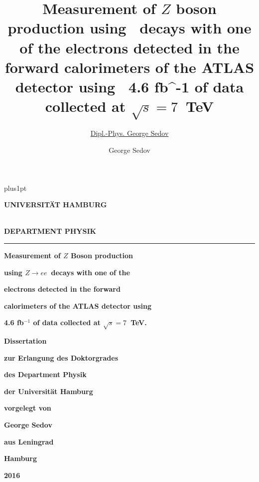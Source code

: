 \documentclass[oneside,11pt]{Classes/PhDthesisPSnPDF}
\title{Measurement of $Z$ boson production using \Zee\ decays with one of the electrons
detected in the forward calorimeters of the ATLAS detector using  4.6 {fb}^{-1} of data
collected at $\sqrt{s} = 7$~TeV}
\author{\href{radist.morse@gmail.com}{Dipl.-Phys. George Sedov}}
\author{George Sedov}
\def\Zee{\ensuremath{Z \rightarrow ee}}
\begin{document}
\hypersetup{linktocpage}
%

\renewcommand\baselinestretch{1.2}
\baselineskip=16pt plus1pt


\begin{titlepage}
\vspace*{-1.6cm}
{\raggedright \large \bf \MakeUppercase{Universit\"{a}t Hamburg}} \\
{\large \bf \MakeUppercase{Department Physik} }\\
  \rule{\textwidth}{0.5pt}
    \vspace*{1.0cm}
	\begin{center}

	     {\huge\bf{Measurement of $Z$ Boson production}\par}
           \vspace*{0.2cm}
	     {\huge\bf{using \Zee\ decays with one of the}\par}
           \vspace*{0.2cm}
	     {\huge\bf{electrons detected in the forward}\par}
           \vspace*{0.2cm}
	     {\huge\bf{calorimeters of the ATLAS detector using }\par}
           \vspace*{0.2cm}
	     {\huge\bf{4.6 fb$^{-1}$ of data collected at $\sqrt{s} = 7$~TeV.}\par}

	        \vspace*{2.6cm}
        {\LARGE\bf Dissertation\par}
	        \vspace*{0.1cm}
	     {\LARGE\bf zur Erlangung des Doktorgrades\par }
	        \vspace*{0.1cm}
        {\LARGE\bf des Department Physik\par }
           \vspace*{0.1cm}
	     {\LARGE\bf der Universit\"{a}t Hamburg \par }
	        \vspace*{2.2cm}
        {\Large\bf vorgelegt von\par}
	        \vspace*{0.1cm}
        {\Large\bf George Sedov\par }
           \vspace{0.1cm}
	     {\Large\bf aus Leningrad \par }
	        \vspace*{2.2cm}
        {\Large\bf{Hamburg}\par}
	        \vspace*{0.1cm}
        {\Large\bf{2016}}
\end{center}
\end{titlepage}
\end{document}

